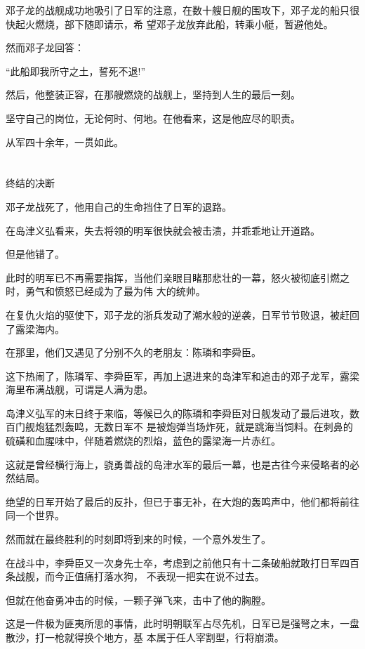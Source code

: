 \documentclass[11pt,a4paper,onecolumn]{article}
\begin{document}
邓子龙的战舰成功地吸引了日军的注意，在数十艘日舰的围攻下，邓子龙的船只很快起火燃烧，部下随即请示，希
望邓子龙放弃此船，转乘小艇，暂避他处。

然而邓子龙回答：

``此船即我所守之土，誓死不退!''

然后，他整装正容，在那艘燃烧的战舰上，坚持到人生的最后一刻。

坚守自己的岗位，无论何时、何地。在他看来，这是他应尽的职责。

从军四十余年，一贯如此。

\section[\thesection]{}

终结的决断

邓子龙战死了，他用自己的生命挡住了日军的退路。

在岛津义弘看来，失去将领的明军很快就会被击溃，并乖乖地让开道路。

但是他错了。

此时的明军已不再需要指挥，当他们亲眼目睹那悲壮的一幕，怒火被彻底引燃之时，勇气和愤怒已经成为了最为伟
大的统帅。

在复仇火焰的驱使下，邓子龙的浙兵发动了潮水般的逆袭，日军节节败退，被赶回了露梁海内。

在那里，他们又遇见了分别不久的老朋友：陈璘和李舜臣。

这下热闹了，陈璘军、李舜臣军，再加上退进来的岛津军和追击的邓子龙军，露梁海里布满战舰，可谓是人满为患。

岛津义弘军的末日终于来临，等候已久的陈璘和李舜臣对日舰发动了最后进攻，数百门舰炮猛烈轰鸣，无数日军不
是被炮弹当场炸死，就是跳海当饲料。在刺鼻的硫磺和血腥味中，伴随着燃烧的烈焰，蓝色的露梁海一片赤红。

这就是曾经横行海上，骁勇善战的岛津水军的最后一幕，也是古往今来侵略者的必然结局。

绝望的日军开始了最后的反扑，但已于事无补，在大炮的轰鸣声中，他们都将前往同一个世界。

然而就在最终胜利的时刻即将到来的时候，一个意外发生了。

在战斗中，李舜臣又一次身先士卒，考虑到之前他只有十二条破船就敢打日军四百条战舰，而今正值痛打落水狗，
不表现一把实在说不过去。

但就在他奋勇冲击的时候，一颗子弹飞来，击中了他的胸膛。

这是一件极为匪夷所思的事情，此时明朝联军占尽先机，日军已是强弩之末，一盘散沙，打一枪就得换个地方，基
本属于任人宰割型，行将崩溃。
\end{document}

